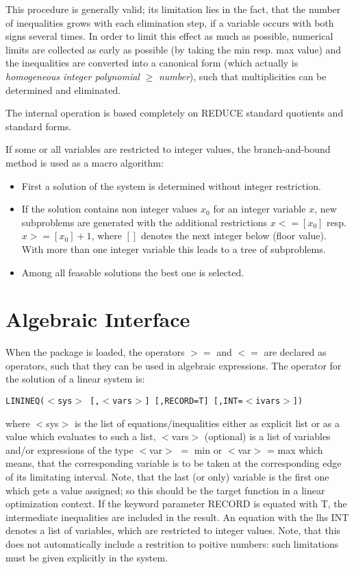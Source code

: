 This procedure is generally valid; its limitation lies in the fact, that
the number of inequalities grows with each elimination step, if a variable
occurs with both signs several times.  In order to limit this effect as
much as possible, numerical limits are collected as early as possible (by
taking the min resp. max value) and the inequalities are converted into a
canonical form (which actually is {\em homogeneous integer polynomial} $\ge$
{\em number}), such that multiplicities can be determined and eliminated.

The internal operation is based completely on REDUCE standard quotients and
standard forms.

If some or all variables are restricted to integer values, the
branch-and-bound method is used as a macro algorithm:

\begin{itemize}
\item First a solution of the system is determined without integer
restriction.

\item If the solution contains non integer values $x_0$ for an integer
variable $x$, new subproblems are generated with the additional
restrictions $x<=[x_0]$ resp. $x>=[x_0]+1$, where $[]$ denotes the next
integer below (floor value).  With more than one integer variable this
leads to a tree of subproblems.

\item Among all feasable solutions the best one is selected.
\end{itemize}

\section{Algebraic Interface}

When the package is loaded, the operators $>=$ and $<=$ are declared as
operators, such that they can be used in algebraic expressions.  The
operator for the solution of a linear system is:
\begin{center}
{\tt LININEQ($<$sys$>$ [,$<$vars$>$] [,RECORD=T] [,INT=$<$ivars$>$])}
\end{center}
\noindent
where $<$sys$>$ is the list of equations/inequalities either as explicit
list or as a value which evaluates to such a list, $<$vars$>$ (optional)
is a list of variables and/or expressions of the type $<$var$>$ $=$ min or
$<$var$>$ = max which means, that the corresponding variable is to be
taken at the corresponding edge of its limitating interval. Note,
that the last (or only) variable is the first one which gets a value
assigned; so this should be the target function in a linear
optimization context. If the keyword parameter RECORD is equated
with T, the intermediate inequalities are included in the result.
An equation with the lhs INT denotes a list of variables, which
are restricted to integer values. Note, that this does not automatically
include a restrition to poitive numbers: such limitations must
be given explicitly in the system.

